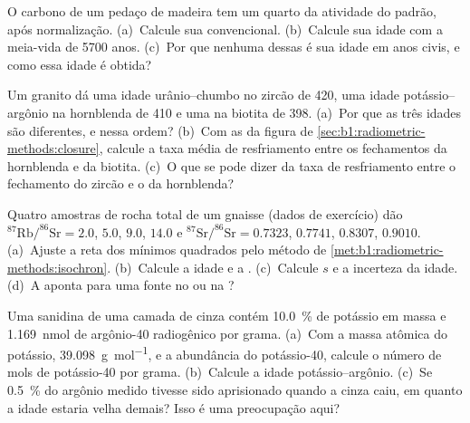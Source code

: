 \begin{exercise}[$\star$]\label{exo:b1:radiometric-methods:3}
O carbono de um pedaço de madeira tem um quarto da atividade do padrão, após normalização.
(a)~Calcule sua  convencional. (b)~Calcule sua idade com a meia-vida de
\num{5700} anos. (c)~Por que nenhuma dessas é sua idade em anos civis, e como essa idade é
obtida?
\end{exercise}

\begin{exercise}[$\star$]\label{exo:b1:radiometric-methods:4}
Um granito dá uma idade urânio--chumbo no zircão de \qty{420}{\Ma}, uma idade
potássio--argônio na hornblenda de \qty{410}{\Ma} e uma na biotita de \qty{398}{\Ma}. (a)~Por que
as três idades são diferentes, e nessa ordem? (b)~Com as  da figura de
\cref{sec:b1:radiometric-methods:closure}, calcule a taxa média de resfriamento entre
os fechamentos da hornblenda e da biotita. (c)~O que se pode dizer da taxa de resfriamento
entre o fechamento do zircão e o da hornblenda?
\end{exercise}

\begin{exercise}[$\star\star$]\label{exo:b1:radiometric-methods:5}
Quatro amostras de rocha total de um gnaisse (dados de exercício) dão
$^{87}\mathrm{Rb}/^{86}\mathrm{Sr} = 2.0$, $5.0$, $9.0$, $14.0$ e
$^{87}\mathrm{Sr}/^{86}\mathrm{Sr} = 0.7323$, $0.7741$, $0.8307$, $0.9010$.
(a)~Ajuste a reta dos mínimos quadrados pelo método de
\cref{met:b1:radiometric-methods:isochron}. (b)~Calcule a idade e a . (c)~Calcule
$s$ e a incerteza da idade. (d)~A  aponta para uma fonte no  ou na ?
\end{exercise}

\begin{exercise}[$\star\star$]\label{exo:b1:radiometric-methods:6}
Uma sanidina de uma camada de cinza contém \qty{10.0}{\percent} de potássio em massa e
\qty{1.169}{nmol} de argônio-40 radiogênico por grama. (a)~Com a massa atômica do potássio,
\qty{39.098}{g.mol^{-1}}, e a abundância do potássio-40, calcule o número de mols de
potássio-40 por grama. (b)~Calcule a idade potássio--argônio. (c)~Se \qty{0.5}{\percent} do
argônio medido tivesse sido aprisionado quando a cinza caiu, em quanto a idade estaria velha
demais? Isso é uma preocupação aqui?
\end{exercise}

